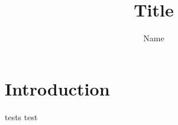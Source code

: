 \documentclass{article}
\title{Title}
\author{Name}
\begin{document}
\maketitle

\section{Introduction}
tests
test
\end{document}
